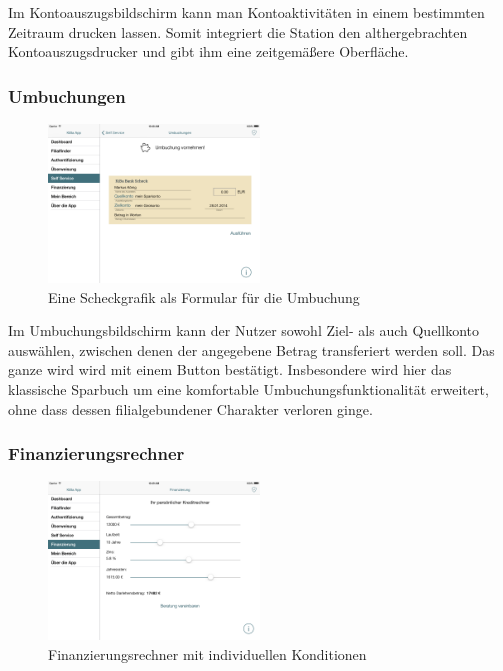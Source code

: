 	Im Kontoauszugsbildschirm kann man Kontoaktivitäten in einem bestimmten Zeitraum drucken lassen. Somit integriert die Station den althergebrachten Kontoauszugsdrucker und gibt ihm eine zeitgemäßere Oberfläche.

\subsubsection{Umbuchungen}
\begin{figure}[h]
	\centering
  \includegraphics[width=0.5\textwidth]{Pictures/umbuchung}
	\caption{Eine Scheckgrafik als Formular für die Umbuchung}
	\label{fig8}
\end{figure}

	Im Umbuchungsbildschirm kann der Nutzer sowohl Ziel- als auch Quellkonto auswählen, zwischen denen der angegebene Betrag transferiert werden soll. Das ganze wird wird mit einem Button bestätigt. Insbesondere wird hier das klassische Sparbuch um eine komfortable Umbuchungsfunktionalität erweitert, ohne dass dessen filialgebundener Charakter verloren ginge.

\subsubsection{Finanzierungsrechner}
\begin{figure}[h]
	\centering
  \includegraphics[width=0.5\textwidth]{Pictures/finanzierung}
	\caption{Finanzierungsrechner mit individuellen Konditionen}
	\label{fig9}
\end{figure}

